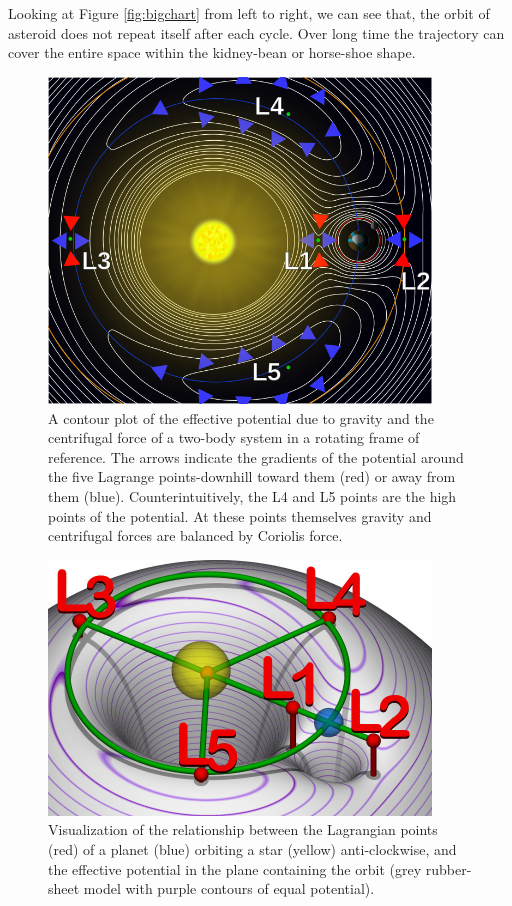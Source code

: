 \documentclass[12pt,a4paper]{article}
\begin{document}
Looking at Figure \ref{fig:bigchart} from left to right, we can see that, the orbit of asteroid does not repeat itself after each cycle. Over long time the trajectory can cover the entire space within the kidney-bean or horse-shoe shape.


\begin{figure}[H]
\centering
\includegraphics[width=4in]{704px-Lagrange_points2.png}
\caption{A contour plot of the effective potential due to gravity and the centrifugal force of a two-body system in a rotating frame of reference. The arrows indicate the gradients of the potential around the five Lagrange points-downhill toward them (red) or away from them (blue). Counterintuitively, the L4 and L5 points are the high points of the potential. At these points themselves gravity and centrifugal forces are balanced by Coriolis force.}
\label{fig:potential}
\end{figure}


\begin{figure}[H]
\centering
\includegraphics[width=4in]{768px-Lagrangian_points_equipotential}
\caption{Visualization of the relationship between the Lagrangian points (red) of a planet (blue) orbiting a star (yellow) anti-clockwise, and the effective potential in the plane containing the orbit (grey rubber-sheet model with purple contours of equal potential).}
\label{fig:potential2}
\end{figure}
\end{document}
